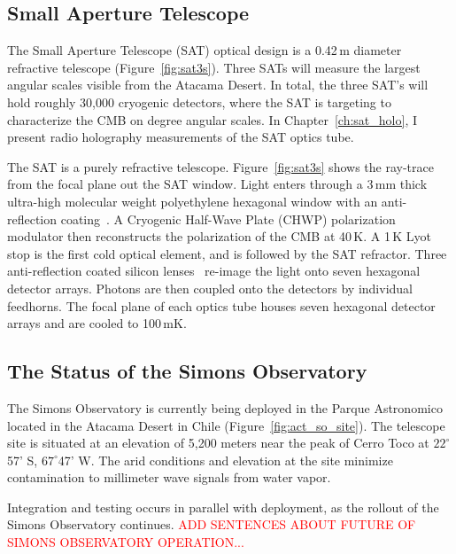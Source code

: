 \subsection{Small Aperture Telescope}

The Small Aperture Telescope (SAT) optical design is a 0.42\,m diameter refractive telescope (Figure~\ref{fig:sat3s}).  Three SATs will measure the largest angular scales visible from the Atacama Desert.  In total, the three SAT's will hold roughly 30,000 cryogenic detectors, where the SAT is targeting to characterize the CMB on degree angular scales.  In Chapter~\ref{ch:sat_holo}, I present radio holography measurements of the SAT optics tube.

The SAT is a purely refractive telescope.  Figure~\ref{fig:sat3s} shows the ray-trace from the focal plane out the SAT window.  Light enters through a 3\,mm thick ultra-high molecular weight polyethylene hexagonal window with an anti-reflection coating~\cite{zhu18}.  A Cryogenic Half-Wave Plate (CHWP) polarization modulator then reconstructs the polarization of the CMB at 40\,K.  A 1\,K Lyot stop is the first cold optical element, and is followed by the SAT refractor.  Three anti-reflection coated silicon lenses~\cite{Datta:13,golec20} re-image the light onto seven hexagonal detector arrays.   Photons are then coupled onto the detectors by individual feedhorns.  The focal plane of each optics tube houses seven hexagonal detector arrays and are cooled to 100\,mK.

\subsection{The Status of the Simons Observatory}

The Simons Observatory is currently being deployed in the Parque Astronomico located in the Atacama Desert in Chile (Figure~\ref{fig:act_so_site}). The telescope site is situated at an elevation of 5,200 meters near the peak of Cerro Toco at $22 ^\circ$ 57' S, $67^\circ$47' W.  The arid conditions and elevation at the site minimize contamination to millimeter wave signals from water vapor.

Integration and testing occurs in parallel with deployment, as the rollout of the Simons Observatory continues. \textcolor{red}{ADD SENTENCES ABOUT FUTURE OF SIMONS OBSERVATORY OPERATION...}